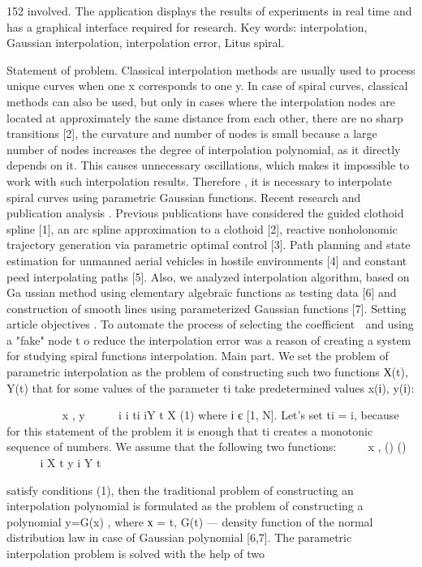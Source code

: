 \documentclass[12pt,a4paper]{article}
\begin{document}
\par
152 involved. The application displays the results of experiments in real time and has a graphical interface required for research. Key words: interpolation, Gaussian interpolation, interpolation error, Litus spiral.
\par
Statement of problem. Classical interpolation methods are usually used to process unique curves when one x corresponds to one y. In case of spiral curves, classical methods can also be used, but only in cases where the interpolation nodes are located at approximately the same distance from each other, there are no sharp transitions [2], the curvature and number of nodes is small because a large number of nodes increases the degree of interpolation polynomial, as it directly depends on it. This causes unnecessary oscillations, which makes it impossible to work with such interpolation results. Therefore , it is necessary to interpolate spiral curves using parametric Gaussian functions. Recent research and publication analysis . Previous publications have considered the guided clothoid spline [1], an arc spline approximation to a clothoid [2], reactive nonholonomic trajectory generation via parametric optimal control [3]. Path planning and state estimation for unmanned aerial vehicles in hostile environments [4] and constant peed interpolating paths [5]. Also, we analyzed interpolation algorithm, based on Ga ussian method using elementary algebraic functions as testing data [6] and construction of smooth lines using parameterized Gaussian functions [7]. Setting article objectives . To automate the process of selecting the coefficient  and using a "fake" node t o reduce the interpolation error was a reason of creating a system for studying spiral functions interpolation. Main part. We set the problem of parametric interpolation as the problem of constructing such two functions Х(t), Y(t) that for some values of the parameter ti take predetermined values x(і), y(і):
\par
        x , y   i i ti iY t X (1) where і є [1, N]. Let's set ti = i, because for this statement of the problem it is enough that ti creates a monotonic sequence of numbers. We assume that the following two functions:     x , () ()    i X t y i Y t
\par
satisfy conditions (1), then the traditional problem of constructing an interpolation polynomial is formulated as the problem of constructing a polynomial y=G(x) , where х = t, G(t) — density function of the normal distribution law in case of Gaussian polynomial [6,7]. The parametric interpolation problem is solved with the help of two
\end{document}
